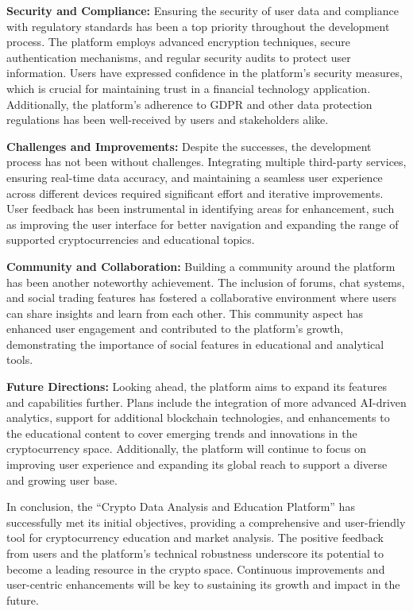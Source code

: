 \documentclass[12pt]{report}
\begin{document}
\textbf{Security and Compliance:} Ensuring the security of user data and compliance with regulatory standards has been a top priority throughout the development process. The platform employs advanced encryption techniques, secure authentication mechanisms, and regular security audits to protect user information. Users have expressed confidence in the platform’s security measures, which is crucial for maintaining trust in a financial technology application. Additionally, the platform’s adherence to GDPR and other data protection regulations has been well-received by users and stakeholders alike.

\textbf{Challenges and Improvements:} Despite the successes, the development process has not been without challenges. Integrating multiple third-party services, ensuring real-time data accuracy, and maintaining a seamless user experience across different devices required significant effort and iterative improvements. User feedback has been instrumental in identifying areas for enhancement, such as improving the user interface for better navigation and expanding the range of supported cryptocurrencies and educational topics.

\textbf{Community and Collaboration:} Building a community around the platform has been another noteworthy achievement. The inclusion of forums, chat systems, and social trading features has fostered a collaborative environment where users can share insights and learn from each other. This community aspect has enhanced user engagement and contributed to the platform’s growth, demonstrating the importance of social features in educational and analytical tools.

\textbf{Future Directions:} Looking ahead, the platform aims to expand its features and capabilities further. Plans include the integration of more advanced AI-driven analytics, support for additional blockchain technologies, and enhancements to the educational content to cover emerging trends and innovations in the cryptocurrency space. Additionally, the platform will continue to focus on improving user experience and expanding its global reach to support a diverse and growing user base.

In conclusion, the “Crypto Data Analysis and Education Platform” has successfully met its initial objectives, providing a comprehensive and user-friendly tool for cryptocurrency education and market analysis. The positive feedback from users and the platform’s technical robustness underscore its potential to become a leading resource in the crypto space. Continuous improvements and user-centric enhancements will be key to sustaining its growth and impact in the future.
\end{document}
